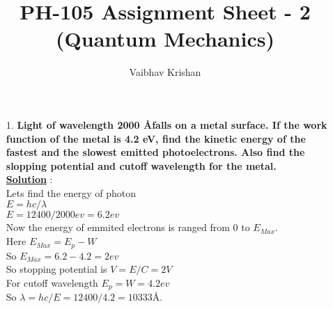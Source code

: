 \documentclass[10pt, a4paper]{article}
\begin{document}
	\title{PH-105 Assignment Sheet - 2 (Quantum Mechanics)}
	\date{}
	\author{Vaibhav Krishan}
	\maketitle
	\newcommand{\angstrom}{\mbox{\normalfont\AA}}
	\begin{enumerate}
		\item[1.] {\bf Light of wavelength 2000 \AA falls on a metal surface. If the work function of the metal is 4.2 eV, find the kinetic energy of the fastest and the slowest emitted photoelectrons. Also find the slopping potential and cutoff wavelength for the metal.}\\
		{\underline {\bf Solution}} :\\
		Lets find the energy of photon\\
		\begin{math} E = hc/\lambda \end{math}\\
		\begin{math} E = 12400 / 2000 ev = 6.2 ev\end{math}\\
		Now the energy of emmited electrons is ranged from 0 to \begin{math} E_{Max}\end{math}.\\
		Here \begin{math} E_{Max} = E_{p} - W \end{math}\\
		So \begin{math} E_{Max} = 6.2 - 4.2 = 2 ev\end{math}\\
		So stopping potential is \begin{math} V = E/C = 2V\end{math}\\
		For cutoff wavelength \begin{math} E_{p} = W = 4.2 ev\end{math}\\
		So \begin{math} \lambda = hc/E = 12400 / 4.2 = 10333 \end{math}\AA.
	\end{enumerate}
\end{document}
